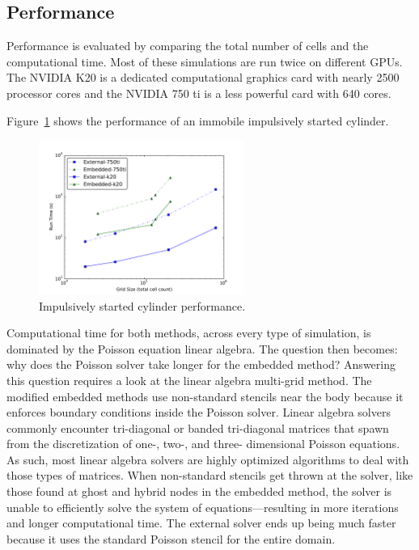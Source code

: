 \documentclass[preprint,12pt]{elsarticle}
\begin{document}
\subsection{Performance}
Performance is evaluated by comparing the total number of cells and the computational time. 
Most of these simulations are run twice on different GPUs. 
The NVIDIA K20 is a dedicated computational graphics card with nearly 2500 processor cores and the NVIDIA 750 ti is a less powerful card with 640 cores.

Figure~\ref{fig:cyperf} shows the performance of an immobile impulsively started cylinder. 
\begin{figure}[!htb]
	\centering
	\par\medskip
	\includegraphics[width=0.6\textwidth]{cylinder_performance}
	\caption{Impulsively started cylinder performance.}
	\label{fig:cyperf}
\end{figure}
Computational time for both methods, across every type of simulation, is dominated by the Poisson equation linear algebra. 
The question then becomes: why does the Poisson solver take longer for the embedded method? 
Answering this question requires a look at the linear algebra multi-grid method.  
The modified embedded methods use non-standard stencils near the body because it enforces boundary conditions inside the Poisson solver.  
Linear algebra solvers commonly encounter tri-diagonal or banded tri-diagonal
matrices that spawn from the discretization of one-, two-, and three- dimensional Poisson equations. 
As such, most linear algebra solvers are highly optimized algorithms to deal with those types of matrices. 
When non-standard stencils get thrown at the solver, like those found at ghost and hybrid nodes in the embedded method, the solver is unable to efficiently solve the system of equations---resulting in more iterations and longer computational time. 
The external solver ends up being much faster because it uses the standard Poisson stencil for the entire domain. 
\end{document}
